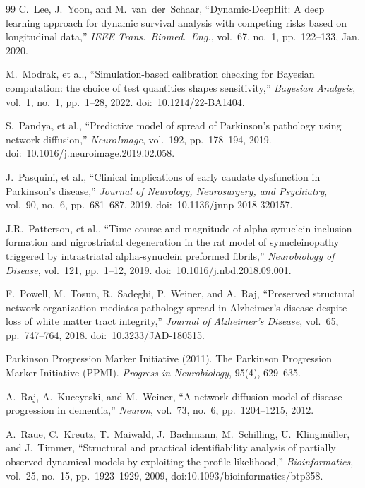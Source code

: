 \begin{thebibliography}{99}
C.~Lee, J.~Yoon, and M.~van~der~Schaar, ``Dynamic-DeepHit: A deep learning approach for dynamic survival analysis with competing risks based on longitudinal data,'' \textit{IEEE Trans.\ Biomed.\ Eng.}, vol.~67, no.~1, pp.~122--133, Jan. 2020.

M.~Modrak, et al., ``Simulation-based calibration checking for Bayesian computation: the choice of test quantities shapes sensitivity,'' \textit{Bayesian Analysis}, vol.~1, no.~1, pp.~1--28, 2022. doi:~10.1214/22-BA1404.

S.~Pandya, et al., ``Predictive model of spread of Parkinson's pathology using network diffusion,'' \textit{NeuroImage}, vol.~192, pp.~178--194, 2019. doi:~10.1016/j.neuroimage.2019.02.058.

J.~Pasquini, et al., ``Clinical implications of early caudate dysfunction in Parkinson's disease,'' \textit{Journal of Neurology, Neurosurgery, and Psychiatry}, vol.~90, no.~6, pp.~681--687, 2019. doi:~10.1136/jnnp-2018-320157.

J.R.~Patterson, et al., ``Time course and magnitude of alpha-synuclein inclusion formation and nigrostriatal degeneration in the rat model of synucleinopathy triggered by intrastriatal alpha-synuclein preformed fibrils,'' \textit{Neurobiology of Disease}, vol.~121, pp.~1--12, 2019. doi:~10.1016/j.nbd.2018.09.001.

F.~Powell, M.~Tosun, R.~Sadeghi, P.~Weiner, and A.~Raj, ``Preserved structural network organization mediates pathology spread in Alzheimer's disease despite loss of white matter tract integrity,'' \textit{Journal of Alzheimer's Disease}, vol.~65, pp.~747--764, 2018. doi:~10.3233/JAD-180515.


Parkinson Progression Marker Initiative (2011).
\newblock The Parkinson Progression Marker Initiative (PPMI).
\newblock \emph{Progress in Neurobiology}, 95(4), 629--635.

A.~Raj, A.~Kuceyeski, and M.~Weiner, ``A network diffusion model of disease progression in dementia,'' \textit{Neuron}, vol.~73, no.~6, pp.~1204--1215, 2012.

A.~Raue, C.~Kreutz, T.~Maiwald, J.~Bachmann, M.~Schilling, U.~Klingm{\"u}ller, and J.~Timmer, ``Structural and practical identifiability analysis of partially observed dynamical models by exploiting the profile likelihood,'' \textit{Bioinformatics}, vol.~25, no.~15, pp.~1923--1929, 2009, doi:10.1093/bioinformatics/btp358.


\end{thebibliography}

